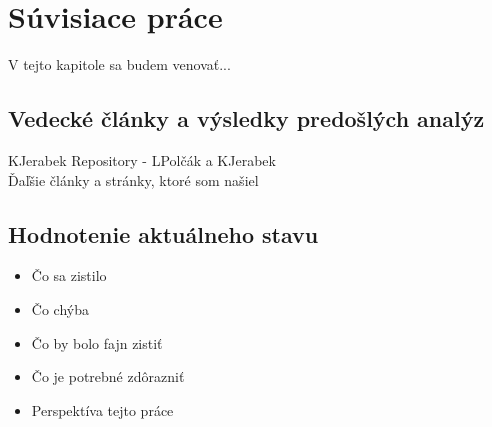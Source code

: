 \chapter{Súvisiace práce}
\label{related-work}

V tejto kapitole sa budem venovať...


\section{Vedecké články a výsledky predošlých analýz}

KJerabek Repository - LPolčák a KJerabek \cite{nel-http-archive, dp-security-issues-nel}
\\
Ďaľšie články a stránky, ktoré som našiel

\section{Hodnotenie aktuálneho stavu}

\begin{itemize}
\item Čo sa zistilo
\item Čo chýba
\item Čo by bolo fajn zistiť
\item Čo je potrebné zdôrazniť
\item Perspektíva tejto práce
\end{itemize}
